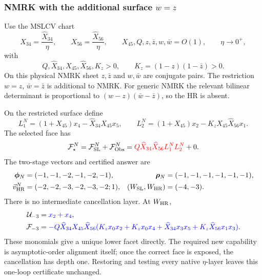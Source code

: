 \documentclass[a4paper,11pt]{article}
\newcommand{\FSL}{\mathcal F_{\rm SL}}
\newcommand{\FObs}{\mathcal F_{\rm Obs}}
\newcommand{\WSL}{W_{\rm SL}}
\newcommand{\WHR}{W_{\rm HR}}
\newcommand{\vHR}{\vec v_{\rm HR}}
\newcommand{\SLcolour}[1]{{\color{red}#1}}
\newcommand{\HRcolour}[1]{{\color{blue}#1}}
\begin{document}
\subsubsection{NMRK with the additional surface \texorpdfstring{\(w=z\)}{w=z}}

Use the MSLCV chart
\begin{equation}
 X_{34}=\frac{\widehat X_{34}}{\eta},\qquad
 X_{56}=\frac{\widehat X_{56}}{\eta},\qquad
 X_{45},Q,z,\bar z,w,\bar w=O(1),\qquad \eta\to0^+,
 \label{eq:nmrk-scaling-example}
\end{equation}
with
\begin{equation}
 Q,\widehat X_{34},X_{45},\widehat X_{56},K_z>0,\qquad
 K_z=(1-z)(1-\bar z)>0.
 \label{eq:nmrk-domain-example}
\end{equation}
On this physical NMRK sheet \(z,\bar z\) and \(w,\bar w\) are conjugate
pairs.  The restriction \(w=z\), \(\bar w=\bar z\) is additional to NMRK.
For generic NMRK the relevant bilinear determinant is proportional to
\((w-z)(\bar w-\bar z)\), so the HR is absent.

On the restricted surface define
\begin{equation}
 L_1^N=(1+X_{45})x_4-\widehat X_{34}X_{45}x_5,\qquad
 L_2^N=(1+X_{45})x_2-K_zX_{45}\widehat X_{56}x_1.
 \label{eq:nmrk-factors-example}
\end{equation}
The selected face has
\begin{equation}
 \mathcal F_\star^N=\FSL^N+\FObs^N
 =\SLcolour{Q\widehat X_{34}\widehat X_{56}L_1^NL_2^N}+0.
 \label{eq:nmrk-decomposition-example}
\end{equation}
The two-stage vectors and certified answer are
\begin{align}
 \boldsymbol\phi_N&=(-1,-1,-2,-1,-2,-1),&
 \boldsymbol\rho_N&=(-1,-1,-1,-1,-1,-1),\nonumber\\
 \vHR^N&=(-2,-2,-3,-2,-3,-2;1),&
 (\WSL,\WHR)&=(-4,-3).
 \label{eq:nmrk-vector-example}
\end{align}
There is no intermediate cancellation layer.  At \(\WHR\),
\begin{align}
 \mathcal U_{-3}&=\HRcolour{x_2+x_4},\nonumber\\
 \mathcal F_{-3}&=\HRcolour{-Q\widehat X_{34}X_{45}\widehat X_{56}
 (K_zx_0x_2+K_zx_0x_4+\widehat X_{34}x_3x_5
 +K_z\widehat X_{56}x_1x_3)}.
 \label{eq:nmrk-WHR-example}
\end{align}
These monomials give a unique lower facet directly.  The required new
capability is asymptotic-order alignment itself; once the correct face is
exposed, the cancellation has depth one.  Restoring and testing every
native \(\eta\)-layer leaves this one-loop certificate unchanged.
\end{document}
